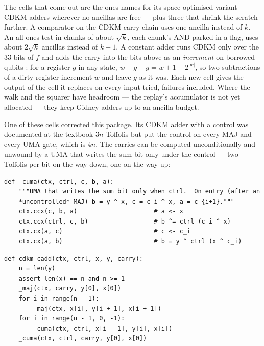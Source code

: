 \documentclass[11pt]{article}
\theoremstyle{plain}
\theoremstyle{remark}
\begin{document}
The cells that come out are the ones \cite{ec:schrott26} names for its space-optimised variant ---
CDKM adders wherever no ancillas are free --- plus three that shrink the scratch further. A
comparator on the CDKM carry chain uses one ancilla instead of $k$. An all-ones test in chunks of
about $\sqrt k$, each chunk's AND parked in a flag, uses about $2\sqrt k$ ancillas instead of $k-1$.
A constant adder runs CDKM only over the $33$ bits of $f$ and adds the carry into the bits above as an
\emph{increment} on borrowed qubits \cite{ec:gidney15}: for a register $g$ in any state,
$w-g-\overline g=w+1-2^{|w|}$, so two subtractions of a dirty register increment $w$ and leave $g$
as it was. Each new cell gives the output of the cell it replaces on every input tried, failures
included. Where the walk and the squarer have headroom --- the replay's accumulator is not yet
allocated --- they keep Gidney adders up to an ancilla budget.

One of these cells corrected this package. Its CDKM adder with a control was documented at the
textbook $3n$ Toffolis but put the control on every MAJ and every UMA gate, which is $4n$. The
carries can be computed unconditionally and unwound by a UMA that writes the sum bit only under the
control --- two Toffolis per bit on the way down, one on the way up:
\begin{lstlisting}
def _cuma(ctx, ctrl, c, b, a):
    """UMA that writes the sum bit only when ctrl.  On entry (after an
    *uncontrolled* MAJ) b = y ^ x, c = c_i ^ x, a = c_{i+1}."""
    ctx.ccx(c, b, a)                     # a <- x
    ctx.ccx(ctrl, c, b)                  # b ^= ctrl (c_i ^ x)
    ctx.cx(a, c)                         # c <- c_i
    ctx.cx(a, b)                         # b = y ^ ctrl (x ^ c_i)
\end{lstlisting}
\begin{lstlisting}
def cdkm_cadd(ctx, ctrl, x, y, carry):
    n = len(y)
    assert len(x) == n and n >= 1
    _maj(ctx, carry, y[0], x[0])
    for i in range(n - 1):
        _maj(ctx, x[i], y[i + 1], x[i + 1])
    for i in range(n - 1, 0, -1):
        _cuma(ctx, ctrl, x[i - 1], y[i], x[i])
    _cuma(ctx, ctrl, carry, y[0], x[0])
\end{lstlisting}
\end{document}
